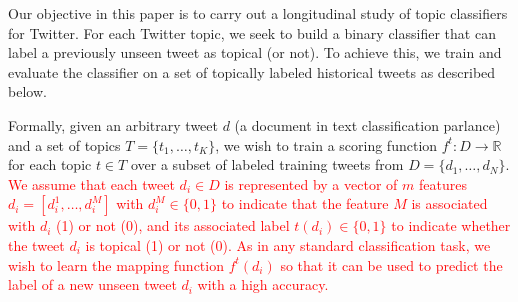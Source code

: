 Our objective in this paper is to carry out a longitudinal study of topic classifiers for Twitter.
For each Twitter topic, we seek to build a binary classifier that can label
a previously unseen tweet as topical (or not).  To achieve this, we 
train and evaluate the classifier on a set of topically labeled historical tweets as described below.

Formally, %
given an arbitrary tweet $d$ (a document in text classification parlance) 
and a set of topics $T = \{
t_1,\ldots,t_K\}$, we wish to train a scoring function $f^t: D \rightarrow \mathbb{R}$
for each topic $t \in T$ over a subset of labeled training tweets from $D = \{
d_1,\ldots,d_N \}$. \textcolor{red}{  We assume that each tweet $d_i \in D$ is represented by a vector of $m$ features $d_i=[d_i^1,\ldots,d_i^M]$ with $d_i^M \in \{0,1\}$ to indicate that the feature $M$ is associated with $d_i$ (1) or not (0),  and its associated label $t(d_i) \in \{
0,1 \}$ to indicate whether the tweet $d_i$ is topical (1) or not (0).  
As in any standard classification task, we wish to learn the mapping function $ f^t(d_i)$ so that it can be used to predict the label of a new unseen tweet $d_i$ with a high accuracy.}


%


